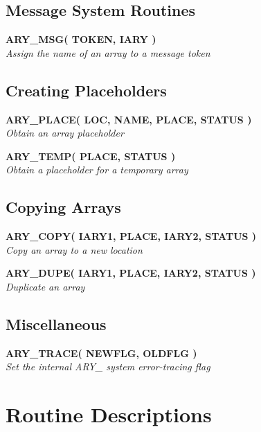 \documentclass[twoside,11pt]{article}
\newcommand{\xlabel}[1]{}
\newcommand{\noteroutine}[2]{\textbf{#1}\hspace*{\fill}\nopagebreak \\
                             \hspace*{3em}\emph{#2}\hspace*{\fill}\par}
\begin{document}
\subsection{\xlabel{message_system_routines}Message System Routines}
\label{message_system_routines}

\noteroutine{ARY\_MSG( TOKEN, IARY )}
            {Assign the name of an array to a message token}


\subsection{\xlabel{creating_placeholders}Creating Placeholders}
\label{creating_placeholders}

\noteroutine{ARY\_PLACE( LOC, NAME, PLACE, STATUS )}
            {Obtain an array placeholder}
\noteroutine{ARY\_TEMP( PLACE, STATUS )}
            {Obtain a placeholder for a temporary array}


\subsection{\xlabel{copying_arrays}Copying Arrays}
\label{copying_arrays}

\noteroutine{ARY\_COPY( IARY1, PLACE, IARY2, STATUS )}
            {Copy an array to a new location}
\noteroutine{ARY\_DUPE( IARY1, PLACE, IARY2, STATUS )}
            {Duplicate an array}


\subsection{\xlabel{miscellaneous}Miscellaneous}
\label{miscellaneous}

\noteroutine{ARY\_TRACE( NEWFLG, OLDFLG )}
            {Set the internal ARY\_ system error-tracing flag}

\newpage
\section{\xlabel{routine_descriptions}Routine Descriptions}
\label{routine_descriptions}
\label{ss:routinedescriptions}
\end{document}

